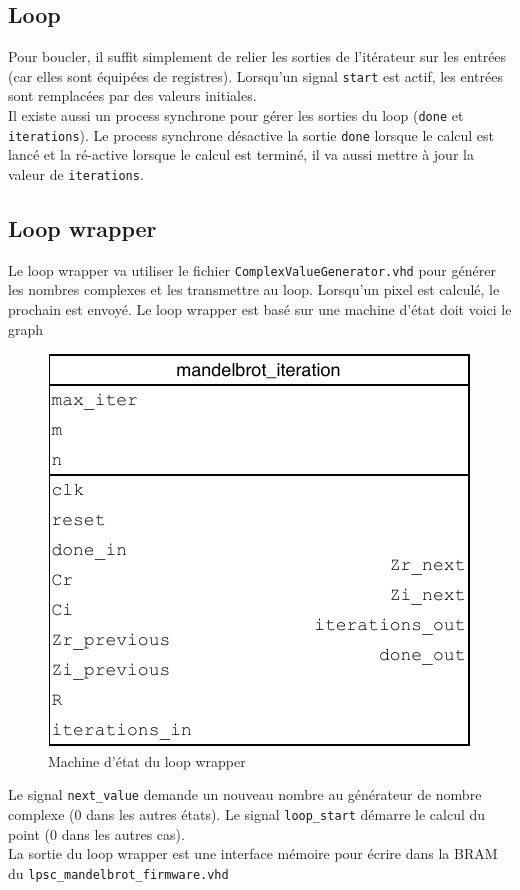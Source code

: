 \documentclass[LPSC_Labo03_SDeriaz]{subfiles}
\begin{document}
\subsection{Loop}
Pour boucler, il suffit simplement de relier les sorties de l'itérateur sur les entrées (car elles sont équipées de registres). Lorsqu'un signal \verb!start! est actif, les entrées sont remplacées par des valeurs initiales.\\
Il existe aussi un process synchrone pour gérer les sorties du loop (\verb!done! et \verb!iterations!). Le process synchrone désactive la sortie \verb!done! lorsque le calcul est lancé et la ré-active lorsque le calcul est terminé, il va aussi mettre à jour la valeur de \verb!iterations!.
\subsection{Loop wrapper}
Le loop wrapper va utiliser le fichier \verb!ComplexValueGenerator.vhd! pour générer les nombres complexes et les transmettre au loop. Lorsqu'un pixel est calculé, le prochain est envoyé. Le loop wrapper est basé sur une machine d'état doit voici le graph
\begin{figure}[H]
\centering
\includegraphics[scale=1,page=5]{../Documents/Schemas-crop.pdf}
\caption{Machine d'état du loop wrapper}
\end{figure}
Le signal \verb!next_value! demande un nouveau nombre au générateur de nombre complexe (0 dans les autres états). Le signal \verb!loop_start! démarre le calcul du point (0 dans les autres cas).\\
La sortie du loop wrapper est une interface mémoire pour écrire dans la BRAM du \verb!lpsc_mandelbrot_firmware.vhd!
\end{document}
